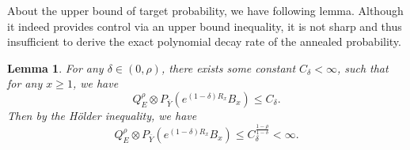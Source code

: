 \documentclass[]{article}
\numberwithin{equation}{section}
\theoremstyle{thmstyleone}%
\theoremstyle{thmstyletwo}%
\theoremstyle{thmstylethree}%
\theoremstyle{thmstylefour}%
\newtheorem{lemma}{Lemma}
\theoremstyle{thmstylefive}%
\theoremstyle{thmstylesix}%
\begin{document}
	
	About the upper bound of target probability, we have following lemma. Although it indeed provides control via an upper bound inequality, it is not sharp and thus insufficient to derive the exact polynomial decay rate of the annealed probability.
	\begin{lemma}\label{lemma of weakly 2}
		For any $\delta\in (0,\rho)$, there exists some constant $ C_\delta <\infty $, such that for any $x\geqslant1$, we have
		\begin{equation*}
			Q^\rho_E\otimes P_{\overline{Y}} \left(
			e^{(1-\delta)R_x} B_x
			\right) \leqslant C_\delta.
		\end{equation*}
	Then by the H\"older inequality, we have
	\begin{equation}
		Q^\rho_E\otimes P_{\overline{Y}} \left(
		e^{(1-\delta)R_x} B_x
		\right) \leqslant C_\delta^{\frac{1-\rho}{1-\delta}}<\infty.
	\end{equation}
\end{lemma}
	
\end{document}
